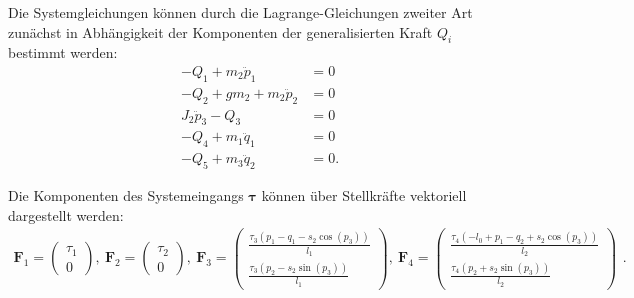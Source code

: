 Die Systemgleichungen können durch die Lagrange-Gleichungen zweiter Art zunächst in Abhängigkeit der Komponenten der generalisierten Kraft $Q_i$ bestimmt werden:
\begin{subequations}
	\begin{align}
		- Q_{1} + m_{2} \ddot{p}_{1} &= 0\\
		- Q_{2} + g m_{2} + m_{2} \ddot{p}_{2} &= 0\\
		J_{2} \ddot{p}_{3} - Q_{3} &= 0\\
		- Q_{4} + m_{1} \ddot{q}_{1} &= 0\\
		- Q_{5} + m_{3} \ddot{q}_{2} &= 0.
	\end{align}
\end{subequations}

Die Komponenten des Systemeingangs $\mathbf{\tau}$ können über Stellkräfte vektoriell dargestellt werden:
\begin{equation}
	\begin{smallmatrix}
		\mathbf{F}_1 =
		\left(\begin{matrix}
			\tau_{1} \\
			0
		\end{matrix}\right), \
		\mathbf{F}_2 =
		\left(\begin{matrix}
			\tau_{2} \\
			0
		\end{matrix}\right), \
		\mathbf{F}_3 =
		\left(\begin{matrix}
			\frac{\tau_{3} \left(p_{1} - q_{1} - s_{2} \cos{\left(p_{3} \right)}\right)}{l_{1}}\\
			\frac{\tau_{3} \left(p_{2} - s_{2} \sin{\left(p_{3} \right)}\right)}{l_{1}}
		\end{matrix}\right), \
		\mathbf{F}_4 =
		\left(\begin{matrix}
			\frac{\tau_{4} \left(- l_{0} + p_{1} - q_{2} + s_{2} \cos{\left(p_{3} \right)}\right)}{l_{2}}\\
			\frac{\tau_{4} \left(p_{2} + s_{2} \sin{\left(p_{3} \right)}\right)}{l_{2}}
		\end{matrix}\right)
	\end{smallmatrix}.
\end{equation}

